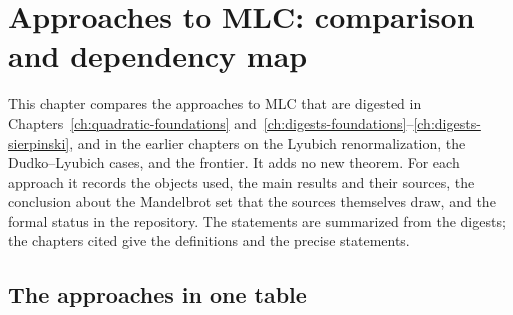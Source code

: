 \chapter{Approaches to MLC: comparison and dependency map}
\label{ch:approaches-map}

This chapter compares the approaches to MLC that are digested in Chapters~\ref{ch:quadratic-foundations}
and~\ref{ch:digests-foundations}--\ref{ch:digests-sierpinski}, and in the earlier chapters on the
Lyubich renormalization, the Dudko--Lyubich cases, and the frontier.  It adds no new theorem.  For each
approach it records the objects used, the main results and their sources, the conclusion about
the Mandelbrot set that the sources themselves draw, and the formal status in the repository.
The statements are summarized from the digests; the chapters cited give the definitions and the
precise statements.

\section{The approaches in one table}
\label{sec:approaches-table}

